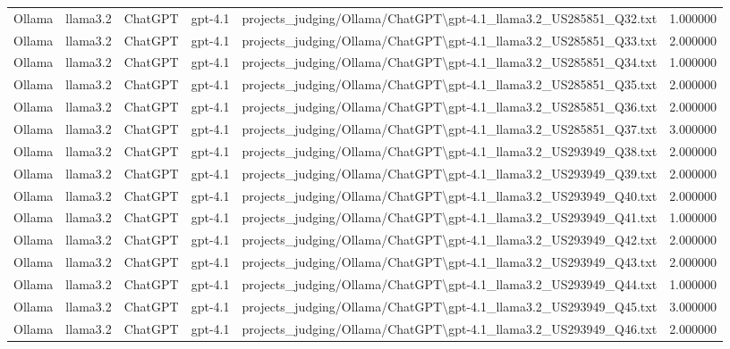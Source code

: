\begin{table}[H]
\begin{tabular}{lllllr}
Ollama & llama3.2 & ChatGPT & gpt-4.1 & projects\_judging/Ollama/ChatGPT\textbackslash gpt-4.1\_llama3.2\_US285851\_Q32.txt & 1.000000 \\
Ollama & llama3.2 & ChatGPT & gpt-4.1 & projects\_judging/Ollama/ChatGPT\textbackslash gpt-4.1\_llama3.2\_US285851\_Q33.txt & 2.000000 \\
Ollama & llama3.2 & ChatGPT & gpt-4.1 & projects\_judging/Ollama/ChatGPT\textbackslash gpt-4.1\_llama3.2\_US285851\_Q34.txt & 1.000000 \\
Ollama & llama3.2 & ChatGPT & gpt-4.1 & projects\_judging/Ollama/ChatGPT\textbackslash gpt-4.1\_llama3.2\_US285851\_Q35.txt & 2.000000 \\
Ollama & llama3.2 & ChatGPT & gpt-4.1 & projects\_judging/Ollama/ChatGPT\textbackslash gpt-4.1\_llama3.2\_US285851\_Q36.txt & 2.000000 \\
Ollama & llama3.2 & ChatGPT & gpt-4.1 & projects\_judging/Ollama/ChatGPT\textbackslash gpt-4.1\_llama3.2\_US285851\_Q37.txt & 3.000000 \\
Ollama & llama3.2 & ChatGPT & gpt-4.1 & projects\_judging/Ollama/ChatGPT\textbackslash gpt-4.1\_llama3.2\_US293949\_Q38.txt & 2.000000 \\
Ollama & llama3.2 & ChatGPT & gpt-4.1 & projects\_judging/Ollama/ChatGPT\textbackslash gpt-4.1\_llama3.2\_US293949\_Q39.txt & 2.000000 \\
Ollama & llama3.2 & ChatGPT & gpt-4.1 & projects\_judging/Ollama/ChatGPT\textbackslash gpt-4.1\_llama3.2\_US293949\_Q40.txt & 2.000000 \\
Ollama & llama3.2 & ChatGPT & gpt-4.1 & projects\_judging/Ollama/ChatGPT\textbackslash gpt-4.1\_llama3.2\_US293949\_Q41.txt & 1.000000 \\
Ollama & llama3.2 & ChatGPT & gpt-4.1 & projects\_judging/Ollama/ChatGPT\textbackslash gpt-4.1\_llama3.2\_US293949\_Q42.txt & 2.000000 \\
Ollama & llama3.2 & ChatGPT & gpt-4.1 & projects\_judging/Ollama/ChatGPT\textbackslash gpt-4.1\_llama3.2\_US293949\_Q43.txt & 2.000000 \\
Ollama & llama3.2 & ChatGPT & gpt-4.1 & projects\_judging/Ollama/ChatGPT\textbackslash gpt-4.1\_llama3.2\_US293949\_Q44.txt & 1.000000 \\
Ollama & llama3.2 & ChatGPT & gpt-4.1 & projects\_judging/Ollama/ChatGPT\textbackslash gpt-4.1\_llama3.2\_US293949\_Q45.txt & 3.000000 \\
Ollama & llama3.2 & ChatGPT & gpt-4.1 & projects\_judging/Ollama/ChatGPT\textbackslash gpt-4.1\_llama3.2\_US293949\_Q46.txt & 2.000000 \\

\end{tabular}
\end{table}
